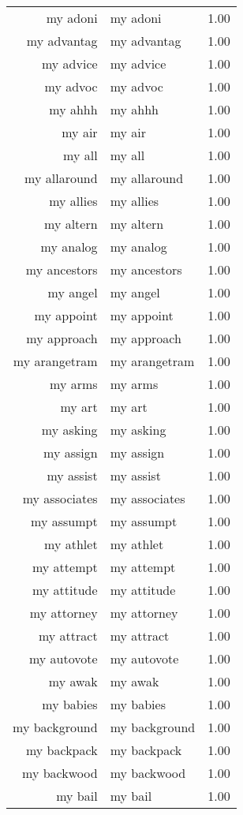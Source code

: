 \begin{table}[ht]
\begin{tabular}{rlr}
  my adoni & my adoni & 1.00 \\ 
  my advantag & my advantag & 1.00 \\ 
  my advice & my advice & 1.00 \\ 
  my advoc & my advoc & 1.00 \\ 
  my ahhh & my ahhh & 1.00 \\ 
  my air & my air & 1.00 \\ 
  my all & my all & 1.00 \\ 
  my allaround & my allaround & 1.00 \\ 
  my allies & my allies & 1.00 \\ 
  my altern & my altern & 1.00 \\ 
  my analog & my analog & 1.00 \\ 
  my ancestors & my ancestors & 1.00 \\ 
  my angel & my angel & 1.00 \\ 
  my appoint & my appoint & 1.00 \\ 
  my approach & my approach & 1.00 \\ 
  my arangetram & my arangetram & 1.00 \\ 
  my arms & my arms & 1.00 \\ 
  my art & my art & 1.00 \\ 
  my asking & my asking & 1.00 \\ 
  my assign & my assign & 1.00 \\ 
  my assist & my assist & 1.00 \\ 
  my associates & my associates & 1.00 \\ 
  my assumpt & my assumpt & 1.00 \\ 
  my athlet & my athlet & 1.00 \\ 
  my attempt & my attempt & 1.00 \\ 
  my attitude & my attitude & 1.00 \\ 
  my attorney & my attorney & 1.00 \\ 
  my attract & my attract & 1.00 \\ 
  my autovote & my autovote & 1.00 \\ 
  my awak & my awak & 1.00 \\ 
  my babies & my babies & 1.00 \\ 
  my background & my background & 1.00 \\ 
  my backpack & my backpack & 1.00 \\ 
  my backwood & my backwood & 1.00 \\ 
  my bail & my bail & 1.00 \\ 

\end{tabular}
\end{table}
